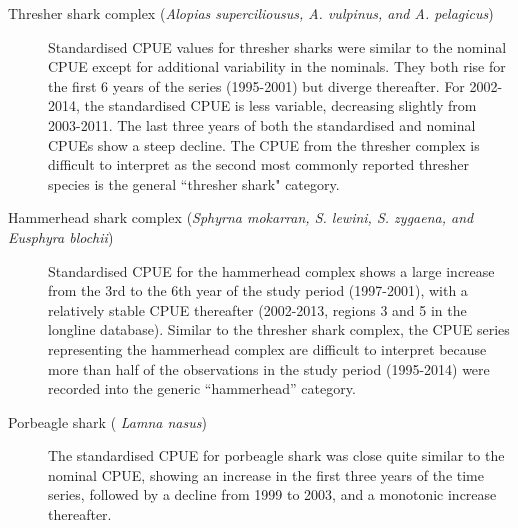 \begin{description}
\item[ Thresher shark complex (\emph{Alopias superciliousus, A. vulpinus, and A. pelagicus})]  
Standardised CPUE values for thresher sharks were similar to the nominal CPUE except for additional variability in the nominals. They both rise for the first 6 years of the series (1995-2001) but diverge thereafter. For 2002-2014, the standardised CPUE is less variable, decreasing slightly from 2003-2011. The last three years of both the standardised and nominal CPUEs show a steep decline.  The CPUE from the thresher complex is difficult to interpret as the second most commonly reported thresher species is the general ``thresher shark" category. 
 
\item[Hammerhead shark complex (\emph{Sphyrna mokarran, S. lewini, S. zygaena, and Eusphyra blochii})]  
Standardised CPUE for the hammerhead complex shows a large increase from the 3rd to the 6th year of the study period (1997-2001), with a relatively stable CPUE thereafter (2002-2013, regions 3 and 5 in the longline database). Similar to the thresher shark complex, the CPUE series representing the hammerhead complex are difficult to interpret because more than half of the observations in the study period (1995-2014) were recorded into the generic ``hammerhead'' category.
 
 \item[Porbeagle shark (\emph{ Lamna nasus}) ] 
 The standardised CPUE for porbeagle shark was close quite similar to the nominal CPUE, showing an increase in the first three years of the time series, followed by a decline from 1999 to 2003, and a monotonic increase thereafter.
 
 
 
\end{description}



